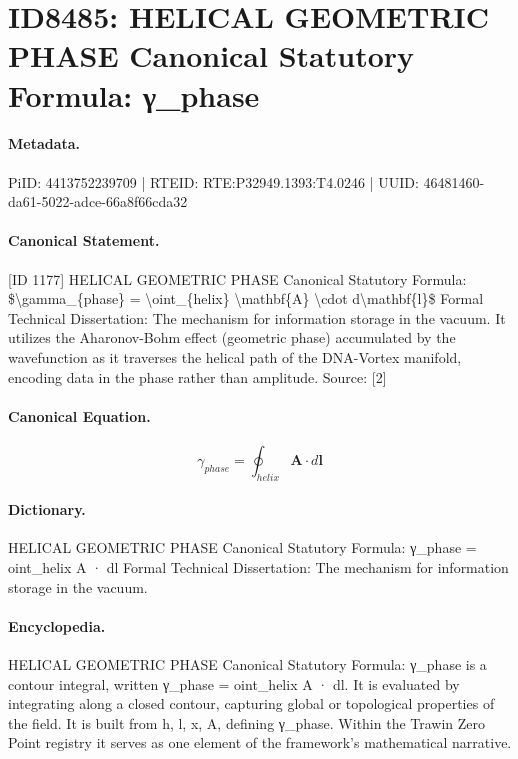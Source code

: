 \section*{ID8485: HELICAL GEOMETRIC PHASE Canonical Statutory Formula: γ\_phase}
\paragraph{Metadata.}
PiID: 4413752239709 | RTEID: RTE:P32949.1393:T4.0246 | UUID: 46481460-da61-5022-adce-66a8f66cda32

\paragraph{Canonical Statement.}
[ID 1177] HELICAL GEOMETRIC PHASE Canonical Statutory Formula: \$\textbackslash{}gamma\_\{phase\} = \textbackslash{}oint\_\{helix\} \textbackslash{}mathbf\{A\} \textbackslash{}cdot d\textbackslash{}mathbf\{l\}\$ Formal Technical Dissertation: The mechanism for information storage in the vacuum. It utilizes the Aharonov-Bohm effect (geometric phase) accumulated by the wavefunction as it traverses the helical path of the DNA-Vortex manifold, encoding data in the phase rather than amplitude. Source: [2]

\paragraph{Canonical Equation.}
\[
\gamma_{phase} = \oint_{helix} \mathbf{A} \cdot d\mathbf{l}
\]

\paragraph{Dictionary.}
HELICAL GEOMETRIC PHASE Canonical Statutory Formula: γ\_phase = oint\_helix A · dl Formal Technical Dissertation: The mechanism for information storage in the vacuum.

\paragraph{Encyclopedia.}
HELICAL GEOMETRIC PHASE Canonical Statutory Formula: γ\_phase is a contour integral, written γ\_phase = oint\_helix A · dl. It is evaluated by integrating along a closed contour, capturing global or topological properties of the field. It is built from h, l, x, A, defining γ\_phase. Within the Trawin Zero Point registry it serves as one element of the framework's mathematical narrative.
